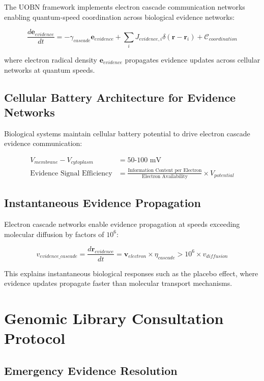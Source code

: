 \documentclass[12pt,a4paper]{article}
\begin{document}
The UOBN framework implements electron cascade communication networks enabling quantum-speed coordination across biological evidence networks:

\begin{equation}
\frac{d\mathbf{e}_{evidence}}{dt} = -\gamma_{cascade} \mathbf{e}_{evidence} + \sum_i J_{evidence,i} \delta(\mathbf{r} - \mathbf{r}_i) + \mathcal{C}_{coordination}
\end{equation}

where electron radical density $\mathbf{e}_{evidence}$ propagates evidence updates across cellular networks at quantum speeds.

\subsection{Cellular Battery Architecture for Evidence Networks}

Biological systems maintain cellular battery potential to drive electron cascade evidence communication:

\begin{align}
V_{membrane} - V_{cytoplasm} &= 50\text{-}100 \text{ mV} \\
\text{Evidence Signal Efficiency} &= \frac{\text{Information Content per Electron}}{\text{Electron Availability}} \times V_{potential}
\end{align}

\subsection{Instantaneous Evidence Propagation}

Electron cascade networks enable evidence propagation at speeds exceeding molecular diffusion by factors of $10^6$:

\begin{equation}
v_{evidence\_cascade} = \frac{d\mathbf{r}_{evidence}}{dt} = \mathbf{v}_{electron} \times \eta_{cascade} > 10^6 \times v_{diffusion}
\end{equation}

This explains instantaneous biological responses such as the placebo effect, where evidence updates propagate faster than molecular transport mechanisms.

\section{Genomic Library Consultation Protocol}

\subsection{Emergency Evidence Resolution}
\end{document}
